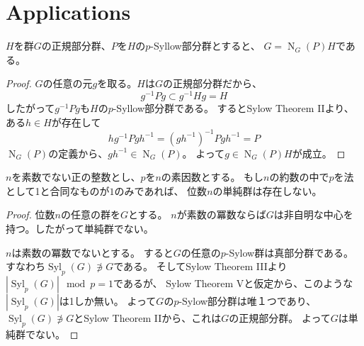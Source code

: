 \documentclass[a4paper]{jarticle}
\newcommand{\Norm}{\operatorname{N}}
\newcommand{\Syl}{\operatorname{Syl}}
\begin{document}
    \section{Applications}
    \begin{Lemma}
        $H$を群$G$の正規部分群、$P$を$H$の$p$-Syllow部分群とすると、
        $G=\Norm_G(P)H$である。
    \end{Lemma}
    \begin{proof}
        $G$の任意の元$g$を取る。$H$は$G$の正規部分群だから、
        \[ g^{-1}Pg \subset g^{-1}Hg=H \]
        したがって$g^{-1}Pg$も$H$の$p$-Syllow部分群である。
        するとSylow Theorem IIより、ある$h \in H$が存在して
        \[ hg^{-1} P gh^{-1} = (gh^{-1})^{-1} P gh^{-1} = P \]
        $\Norm_G(P)$の定義から、$gh^{-1} \in \Norm_G(P)$。
        よって$g \in \Norm_G(P)H$が成立。
        
    \end{proof}

    \begin{Prop}
        $n$を素数でない正の整数とし、$p$を$n$の素因数とする。
        もし$n$の約数の中で$p$を法として1と合同なものが$1$のみであれば、
        位数$n$の単純群は存在しない。
    \end{Prop}
    \begin{proof}
        位数$n$の任意の群を$G$とする。
        $n$が素数の冪数ならば$G$は非自明な中心を持つ。したがって単純群でない。

        $n$は素数の冪数でないとする。
        すると$G$の任意の$p$-Sylow群は真部分群である。すなわち$\Syl_p(G) \not \ni G$である。
        そしてSylow Theorem IIIより$|\Syl_p(G)| \mod p=1$であるが、
        Sylow Theorem Vと仮定から、このような$|\Syl_p(G)|$は1しか無い。
        よって$G$の$p$-Sylow部分群は唯１つであり、
        $\Syl_p(G) \not \ni G$とSylow Theorem IIから、これは$G$の正規部分群。
        よって$G$は単純群でない。
    \end{proof}
\end{document}
